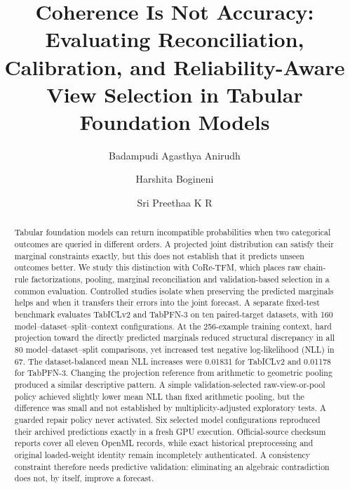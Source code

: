 \documentclass[a4paper,fleqn]{cas-sc}
\begin{document}
\title[mode=title]{Coherence Is Not Accuracy: Evaluating Reconciliation, Calibration, and Reliability-Aware View Selection in Tabular Foundation Models}

\author[vit]{Badampudi Agasthya Anirudh}
\author[vit]{Harshita Bogineni}
\author[vit]{Sri Preethaa K R}
\cormark[1]

\begin{abstract}
Tabular foundation models can return incompatible probabilities when two categorical outcomes are queried in different orders. A projected joint distribution can satisfy their marginal constraints exactly, but this does not establish that it predicts unseen outcomes better. We study this distinction with CoRe-TFM, which places raw chain-rule factorizations, pooling, marginal reconciliation and validation-based selection in a common evaluation. Controlled studies isolate when preserving the predicted marginals helps and when it transfers their errors into the joint forecast. A separate fixed-test benchmark evaluates TabICLv2 and TabPFN-3 on ten paired-target datasets, with 160 model--dataset--split--context configurations. At the 256-example training context, hard projection toward the directly predicted marginals reduced structural discrepancy in all 80 model--dataset--split comparisons, yet increased test negative log-likelihood (NLL) in 67. The dataset-balanced mean NLL increases were 0.01831 for TabICLv2 and 0.01178 for TabPFN-3. Changing the projection reference from arithmetic to geometric pooling produced a similar descriptive pattern. A simple validation-selected raw-view-or-pool policy achieved slightly lower mean NLL than fixed arithmetic pooling, but the difference was small and not established by multiplicity-adjusted exploratory tests. A guarded repair policy never activated. Six selected model configurations reproduced their archived predictions exactly in a fresh GPU execution. Official-source checksum reports cover all eleven OpenML records, while exact historical preprocessing and original loaded-weight identity remain incompletely authenticated. A consistency constraint therefore needs predictive validation: eliminating an algebraic contradiction does not, by itself, improve a forecast.
\end{abstract}
\end{document}
